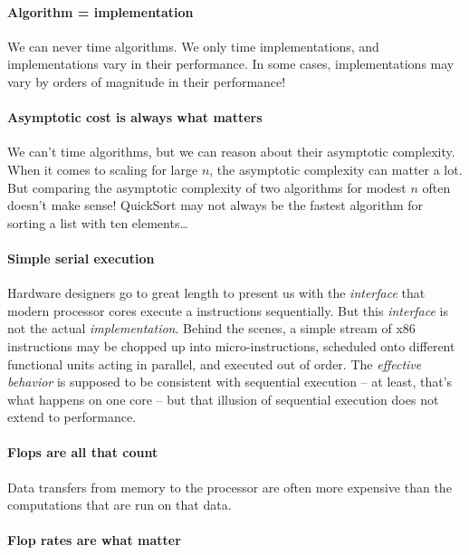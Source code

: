 \documentclass[12pt, leqno]{article} %
\begin{document}
\paragraph{Algorithm = implementation}

We can never time algorithms. We only time implementations, and
implementations vary in their performance. In some cases,
implementations may vary by orders of magnitude in their performance!

\paragraph{Asymptotic cost is always what matters}

We can't time algorithms, but we can reason about their asymptotic
complexity. When it comes to scaling for large $n$, the asymptotic
complexity can matter a lot. But comparing the asymptotic complexity of
two algorithms for modest $n$ often doesn't make sense! QuickSort may
not always be the fastest algorithm for sorting a list with ten
elements\ldots{}

\paragraph{Simple serial execution}

Hardware designers go to great length to present us with the
\emph{interface} that modern processor cores execute a instructions
sequentially. But this \emph{interface} is not the actual
\emph{implementation}. Behind the scenes, a simple stream of x86
instructions may be chopped up into micro-instructions, scheduled onto
different functional units acting in parallel, and executed out of
order. The \emph{effective behavior} is supposed to be consistent with
sequential execution -- at least, that's what happens on one core -- but
that illusion of sequential execution does not extend to performance.

\paragraph{Flops are all that count}

Data transfers from memory to the processor are often more expensive
than the computations that are run on that data.

\paragraph{Flop rates are what matter}
\end{document}
